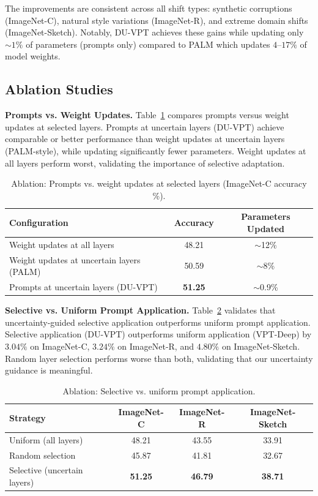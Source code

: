 \documentclass[11pt,a4paper]{article}
\begin{document}
The improvements are consistent across all shift types: synthetic corruptions (ImageNet-C), natural style variations (ImageNet-R), and extreme domain shifts (ImageNet-Sketch). Notably, DU-VPT achieves these gains while updating only ${\sim}1\%$ of parameters (prompts only) compared to PALM which updates $4$--$17\%$ of model weights.

\subsection{Ablation Studies}

\textbf{Prompts vs. Weight Updates.} Table~\ref{tab:prompt_vs_weight} compares prompts versus weight updates at selected layers. Prompts at uncertain layers (DU-VPT) achieve comparable or better performance than weight updates at uncertain layers (PALM-style), while updating significantly fewer parameters. Weight updates at all layers perform worst, validating the importance of selective adaptation.

\begin{table}[t]
\caption{Ablation: Prompts vs. weight updates at selected layers (ImageNet-C accuracy \%).}
\label{tab:prompt_vs_weight}
\centering
\begin{tabular}{lcc}
\toprule
Configuration & Accuracy & Parameters Updated \\
\midrule
Weight updates at all layers & 48.21 & ${\sim}$12\% \\
Weight updates at uncertain layers (PALM) & 50.59 & ${\sim}$8\% \\
Prompts at uncertain layers (DU-VPT) & \textbf{51.25} & ${\sim}$0.9\% \\
\bottomrule
\end{tabular}
\end{table}

\textbf{Selective vs. Uniform Prompt Application.} Table~\ref{tab:selective_vs_uniform} validates that uncertainty-guided selective application outperforms uniform prompt application. Selective application (DU-VPT) outperforms uniform application (VPT-Deep) by $3.04\%$ on ImageNet-C, $3.24\%$ on ImageNet-R, and $4.80\%$ on ImageNet-Sketch. Random layer selection performs worse than both, validating that our uncertainty guidance is meaningful.

\begin{table}[t]
\caption{Ablation: Selective vs. uniform prompt application.}
\label{tab:selective_vs_uniform}
\centering
\begin{tabular}{lccc}
\toprule
Strategy & ImageNet-C & ImageNet-R & ImageNet-Sketch \\
\midrule
Uniform (all layers) & 48.21 & 43.55 & 33.91 \\
Random selection & 45.87 & 41.81 & 32.67 \\
Selective (uncertain layers) & \textbf{51.25} & \textbf{46.79} & \textbf{38.71} \\
\bottomrule
\end{tabular}
\end{table}
\end{document}

